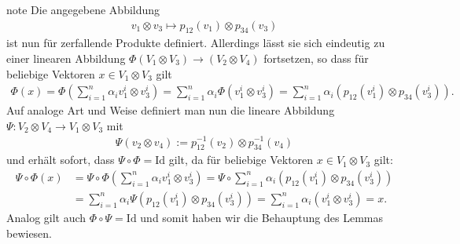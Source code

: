 \documentclass[letterpaper,10pt,german]{jupyterBook}
\begin{document}
\begin{sphinxadmonition}{note}
\sphinxAtStartPar
Die angegebene Abbildung
\begin{equation*}
\begin{split}v_1\otimes v_3 \mapsto p_{12}(v_1)\otimes p_{34}(v_3)\end{split}
\end{equation*}
\sphinxAtStartPar
ist nun  für zerfallende Produkte definiert.
Allerdings lässt sie sich eindeutig zu einer linearen Abbildung \(\Phi(V_1\otimes V_3)\to (V_2\otimes V_4)\) fortsetzen, so dass für beliebige Vektoren \(x \in V_1 \otimes V_3\) gilt
\begin{equation*}
\begin{split}\Phi(x) = \Phi(\sum_{i=1}^n \alpha_i v_1^i \otimes v_3^i) = 
\sum_{i=1}^n \alpha_i \Phi(v_1^i \otimes v_3^i) = 
\sum_{i=1}^n \alpha_i (p_{12}(v_1^i)\otimes p_{34}(v_3^i)).\end{split}
\end{equation*}
\sphinxAtStartPar
Auf analoge Art und Weise definiert man nun die lineare Abbildung \(\Psi \colon V_2 \otimes V_4 \rightarrow V_1 \otimes V_3\) mit
\begin{equation*}
\begin{split}\Psi(v_2\otimes v_4) := p_{12}^{-1}(v_2)\otimes p_{34}^{-1}(v_4)\end{split}
\end{equation*}
\sphinxAtStartPar
und erhält sofort, dass \(\Psi\circ\Phi = \mathrm{Id}\) gilt, da für beliebige Vektoren \(x \in V_1 \otimes V_3\) gilt:
\begin{equation*}
\begin{split}\Psi \circ \Phi(x) &= \Psi \circ \Phi(\sum_{i=1}^n \alpha_i v_1^i \otimes v_3^i) = \Psi \circ \sum_{i=1}^n \alpha_i (p_{12}(v_1^i)\otimes p_{34}(v_3^i)) \\
&= \sum_{i=1}^n \alpha_i \Psi(p_{12}(v_1^i)\otimes p_{34}(v_3^i)) = \sum_{i=1}^n \alpha_i (v_1^i \otimes v_3^i) = x.\end{split}
\end{equation*}
\sphinxAtStartPar
Analog gilt auch \(\Phi\circ\Psi = \mathrm{Id}\) und somit haben wir die Behauptung des Lemmas bewiesen.
\end{sphinxadmonition}
\end{document}
